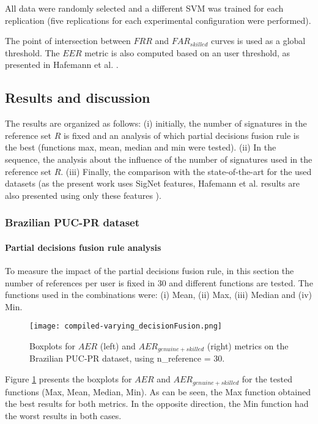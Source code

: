 \documentclass[conference]{IEEEtran}
\begin{document}
All data were randomly selected and a different SVM was trained for each replication (five replications for each experimental configuration were performed).


The point of intersection between $FRR$ and $FAR_{skilled}$ curves is used as a global threshold. The $EER$ metric is also computed based on an user threshold, as presented in Hafemann et al. \cite{hafemann:17}.






\subsection{Results and discussion}


The results are organized as follows: (i) initially, the number of signatures in the reference set $R$ is fixed and an analysis of which partial decisions fusion rule is the best (functions max, mean, median and min were tested). (ii) In the sequence, the analysis about the influence of the number of signatures used in the reference set $R$. (iii) Finally, the comparison with the state-of-the-art for the used datasets (as the present work uses SigNet features, Hafemann et al. results are also presented using only these features \cite{hafemann:17}).


\subsubsection{Brazilian PUC-PR dataset}


\paragraph{Partial decisions fusion rule analysis}
To measure the impact of the partial decisions fusion rule, in this section  the number of references per user is fixed in 30 and different functions are tested. The functions used in the combinations were: (i) Mean, (ii) Max, (iii) Median and (iv) Min.




\begin{figure}[!htb]
\centering
  \texttt{[image: compiled-varying\_decisionFusion.png]}
  \caption{Boxplots for $AER$ (left) and $AER_{genuine+skilled}$ (right) metrics on the Brazilian PUC-PR dataset, using n\_reference = 30.}
  \label{fig:varying_decisionFusion}
\end{figure}


Figure \ref{fig:varying_decisionFusion} presents the boxplots for $AER$ and $AER_{genuine+skilled}$ for the tested functions (Max, Mean, Median, Min). As can be seen, the Max function obtained the best results for both metrics. In the opposite direction, the Min function had the worst results in both cases.
\end{document}

